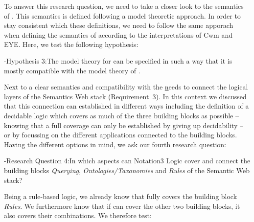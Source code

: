 To answer this research question, we need to take a closer look to the semantics of \rdf \cite{RDFSemantics}. This semantics is defined following a model theoretic approach.
In order  to stay consistent which these definitions, we need to follow the same apporach when defining the semantics of \nthree 
according to the interpretations of Cwm and EYE. %
Here, we test the following hypothesis:

\hyp{Hypothesis 3:}{The model theory for \nthreelogic can be specified in such a way that it is mostly compatible with the model theory of \rdf.}

Next to a clear semantics and compatibility with \rdf the \ul needs to connect the logical layers of the Semantics Web stack (Requirement~3).
In this context we discussed that this connection can established in different ways including the definition of a decidable logic which covers as much of the three building blocks 
as possible
-- knowing that a full coverage can only be established by giving up decidability -- or by focussing on the different applications connected to the building blocks.
Having the different options in mind, we ask our fourth research question:

\hyp{Research Question 4:}{In which aspects can Notation3 Logic cover and connect the building blocks \emph{Querying}, \emph{Ontologies/Taxonomies} and \emph{Rules} 
of the Semantic Web stack?}

Being a rule-based logic, we already know that \nthreelogic fully covers the building block \emph{Rules}. We furthermore know that if
\nthree can cover the other two building blocks, it also covers their combinations.
We therefore test:


